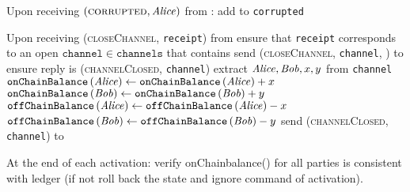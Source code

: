 \begin{functionality}{\fpaynet}
\begin{algorithmic}[1]
    \State Upon receiving $\left(\textsc{corrupted}, \mathit{Alice}\right)$ from
    \simulator:
    \Indent
      \State add \alice{} to \texttt{corrupted}
    \EndIndent
    \State

    \State Upon receiving (\textsc{closeChannel}, \texttt{receipt}) from \alice
    \Indent
      \State ensure that \texttt{receipt} corresponds to an open
      $\mathtt{channel} \in \mathtt{channels}$ that contains \alice
      \State send (\textsc{closeChannel}, \texttt{channel}, \alice) to
      \simulator
      \State ensure reply is (\textsc{channelClosed}, \texttt{channel})
      \State extract $\mathit{Alice}, \mathit{Bob}, x, y$ from \texttt{channel}
      \State $\mathtt{onChainBalance}\left(\mathit{Alice}\right) \gets
      \mathtt{onChainBalance}\left(\mathit{Alice}\right) + x$
      \State {}
      \State $\mathtt{onChainBalance}\left(\mathit{Bob}\right) \gets
      \mathtt{onChainBalance}\left(\mathit{Bob}\right) + y$
      \State $\mathtt{offChainBalance}\left(\mathit{Alice}\right) \gets
      \mathtt{offChainBalance}\left(\mathit{Alice}\right) - x$
      \State $\mathtt{offChainBalance}\left(\mathit{Bob}\right) \gets
      \mathtt{offChainBalance}\left(\mathit{Bob}\right) - y$
      \State send (\textsc{channelClosed}, \texttt{channel}) to \alice
    \EndIndent
    \State

    \State At the end of each activation: 
    \Indent
    \State verify  onChainbalance() for all parties is consistent with ledger (if not roll back the state and ignore command of activation).
    \EndIndent
  \end{algorithmic}
\end{functionality}
